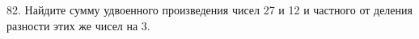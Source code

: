 82. Найдите сумму удвоенного произведения чисел 27 и 12 и частного от деления разности этих же чисел на 3.\\
